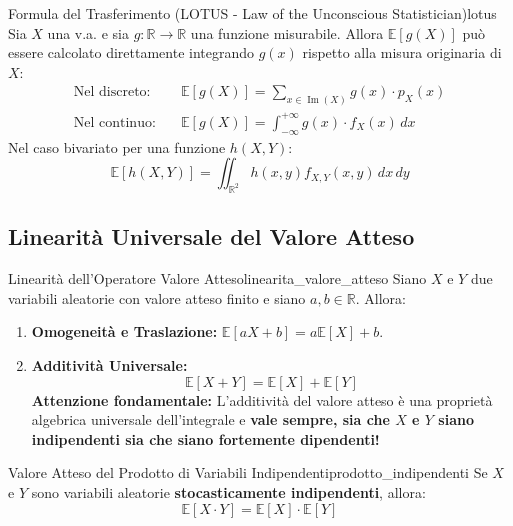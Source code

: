 \begin{teorema}{Formula del Trasferimento (LOTUS - Law of the Unconscious Statistician)}{lotus}
Sia $X$ una v.a. e sia $g: \mathbb{R} \to \mathbb{R}$ una funzione misurabile. Allora $\mathbb{E}[g(X)]$ può essere calcolato direttamente integrando $g(x)$ rispetto alla misura originaria di $X$:
\begin{align}
    \text{Nel discreto:} \quad & \mathbb{E}[g(X)] = \sum_{x \in \operatorname{Im}(X)} g(x) \cdot p_X(x) \\
    \text{Nel continuo:} \quad & \mathbb{E}[g(X)] = \int_{-\infty}^{+\infty} g(x) \cdot f_X(x) \, dx
\end{align}
Nel caso bivariato per una funzione $h(X, Y)$:
\begin{equation}
    \mathbb{E}[h(X, Y)] = \iint_{\mathbb{R}^2} h(x, y) f_{X,Y}(x, y) \, dx \, dy
\end{equation}
\end{teorema}

\subsection{Linearità Universale del Valore Atteso}

\begin{teorema}{Linearità dell'Operatore Valore Atteso}{linearita_valore_atteso}
Siano $X$ e $Y$ due variabili aleatorie con valore atteso finito e siano $a, b \in \mathbb{R}$. Allora:
\begin{enumerate}
    \item \textbf{Omogeneità e Traslazione:} $\mathbb{E}[aX + b] = a\mathbb{E}[X] + b$.
    \item \textbf{Additività Universale:}
    \begin{equation}
        \mathbb{E}[X + Y] = \mathbb{E}[X] + \mathbb{E}[Y]
    \end{equation}
    \textbf{Attenzione fondamentale:} L'additività del valore atteso è una proprietà algebrica universale dell'integrale e \textbf{vale sempre, sia che $X$ e $Y$ siano indipendenti sia che siano fortemente dipendenti!}
\end{enumerate}
\end{teorema}

\begin{proposizione}{Valore Atteso del Prodotto di Variabili Indipendenti}{prodotto_indipendenti}
Se $X$ e $Y$ sono variabili aleatorie \textbf{stocasticamente indipendenti}, allora:
\begin{equation}
    \mathbb{E}[X \cdot Y] = \mathbb{E}[X] \cdot \mathbb{E}[Y]
\end{equation}
\end{proposizione}


